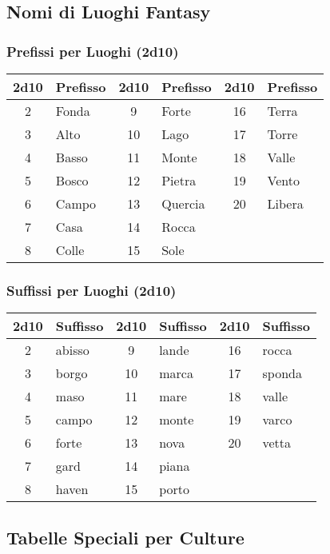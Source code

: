 \begin{multicols}{2}
{\subsection*{Nomi di Luoghi Fantasy}

\subsubsection*{Prefissi per Luoghi (2d10)}
\noindent\begin{tabular}{|c|l|c|l|c|l|}
\hline
\textbf{2d10} & \textbf{Prefisso} & \textbf{2d10} & \textbf{Prefisso} & \textbf{2d10} & \textbf{Prefisso} \\
\hline
2 & Fonda & 9 & Forte & 16 & Terra \\
3 & Alto & 10 & Lago & 17 & Torre \\
4 & Basso & 11 & Monte & 18 & Valle \\
5 & Bosco & 12 & Pietra & 19 & Vento \\
6 & Campo & 13 & Quercia & 20 & Libera \\
7 & Casa & 14 & Rocca & & \\
8 & Colle & 15 & Sole & & \\
\hline
\end{tabular}

\subsubsection*{Suffissi per Luoghi (2d10)}

\noindent\begin{tabular}{|c|l|c|l|c|l|}
\hline
\textbf{2d10} & \textbf{Suffisso} & \textbf{2d10} & \textbf{Suffisso} & \textbf{2d10} & \textbf{Suffisso} \\
\hline
2 & abisso & 9 & lande & 16 & rocca \\
3 & borgo & 10 & marca & 17 & sponda \\
4 & maso & 11 & mare & 18 & valle \\
5 & campo & 12 & monte & 19 & varco \\
6 & forte & 13 & nova & 20 & vetta \\
7 & gard & 14 & piana & & \\
8 & haven & 15 & porto & & \\
\hline
\end{tabular}



\subsection*{Tabelle Speciali per Culture}

}
\end{multicols}
